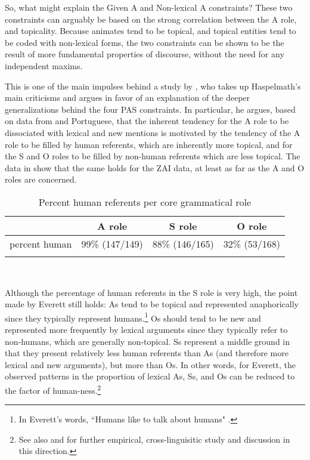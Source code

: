 So, what might explain the Given A and Non-lexical A constraints? These two constraints can arguably be based on the strong correlation between the A role,  and topicality. Because animates tend to be topical, and topical entities tend to be coded with non-lexical forms, the two constraints can be shown to be the result of more fundamental properties of discourse, without the need for any independent maxims. 

This is one of the main impulses behind a study by \citet{everett2009}, who takes up Haspelmath's main criticisms and argues in favor of an explanation of the deeper generalizations behind the four PAS constraints. In particular, he argues, based on data from  and Portuguese, that the inherent tendency for the A role to be dissociated with lexical and new mentions is motivated by the tendency of the A role to be filled by human referents, which are inherently more topical, and for the S and O roles to be filled by non-human referents which are less topical. The data in  show that the same holds for the ZAI data, at least as far as the A and O roles are concerned.

\begin{table} 

\caption{{Percent human referents per core grammatical role}}
\begin{tabular}{ r  c  c  c }
\lsptoprule
 & A role & S role & O role\\

\midrule
percent human & 99{\%} (147/149) & 88{\%} (146/165) & 32{\%} (53/168)  \\
  
\lspbottomrule
\end{tabular}\\
\label{humandist}

\end{table}
Although the percentage of human referents in the S role is very high, the point made by Everett still holds: As tend to be topical and represented anaphorically since they typically represent humans.\footnote{In Everett's words, ``Humans like to talk about humans" \citep[21]{everett2009}.} Os should tend to be new and represented more frequently by lexical arguments since they typically refer to non-humans, which are generally non-topical. Ss represent a middle ground in that they present relatively less human referents than As (and therefore more lexical and new arguments), but more than Os. In other words, for Everett, the observed patterns in the proportion of lexical As, Ss, and Os can be reduced to the factor of human-ness.\footnote{See also \citet{haig2016} and \citet{schnell2017} for further empirical, cross-linguisitic study and discussion in this direction.} 


